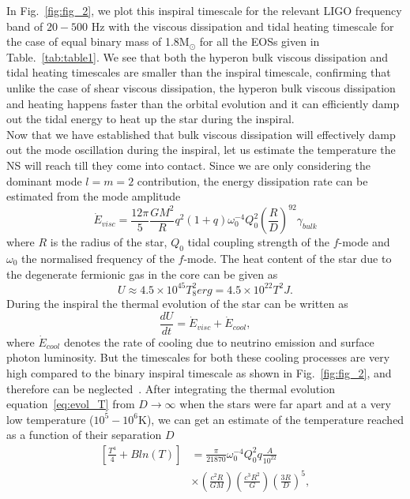 \documentclass[%
 reprint,
 amsmath,amssymb,
 aps,
]{revtex4-2}
\begin{document}
In Fig.~\ref{fig:fig_2}, we plot this inspiral timescale for the relevant LIGO frequency band of $20-500$ Hz with the viscous dissipation and tidal heating timescale for the case of equal binary mass of 1.8M$_{\odot}$ for all the EOSs given in Table.~\ref{tab:table1}. We see that both the hyperon bulk viscous dissipation and tidal heating timescales are smaller than the inspiral timescale, confirming that unlike the case of shear viscous dissipation, the hyperon bulk viscous dissipation and heating happens faster than the orbital evolution and it can efficiently damp out the tidal energy  to heat up the star during the inspiral. \\

Now that we have established that bulk viscous dissipation will effectively damp out the mode oscillation during the inspiral, let us estimate the temperature the NS will reach till they come into contact. Since we are only considering the dominant mode $l = m = 2$ contribution, the energy dissipation rate can be estimated from the mode amplitude~\cite{Lai_1994}
\begin{equation}\label{eq:viscener}
    \Dot{E}_{visc} = \frac{12\pi}{5}\frac{GM^2}{R}q^2(1+q)\omega_0^{-4}Q_0^2\left(\frac{R}{D}\right)^92\gamma_{bulk}
\end{equation}
where $R$ is the radius of the star, $Q_0$  tidal coupling strength of the $f$-mode and $\omega_0$ the normalised frequency of the $f$-mode. The heat content of the star due to the degenerate fermionic gas in the core can be given as~\cite{Lai_1994}
\begin{equation}\label{eq:heat}
    U \approx 4.5\times 10^{45}T_8^2 erg = 4.5\times 10^{22}T^2 J .
\end{equation}
During the inspiral the thermal evolution of the star can be written as
\begin{equation}\label{eq:evol_T}
    \frac{dU}{dt} = \Dot{E}_{visc} + \Dot{E}_{cool},
\end{equation}
where $\Dot{E}_{cool}$ denotes the rate of cooling due to neutrino emission and surface photon luminosity. But the timescales for both these cooling processes are very high compared to the binary inspiral timescale as shown in Fig.~\ref{fig:fig_2}, and therefore can be neglected~\cite{Rees1992}. After integrating the thermal evolution equation~\eqref{eq:evol_T} from $D \to \infty$ when the stars were far apart and at a very low temperature ($10^5 - 10^6$K), we can get an estimate of the temperature reached as a function of their separation $D$
\begin{equation}\label{eq:final_T}
\begin{split}
    \left[\frac{T^4}{4} + Bln(T)\right] &=  \frac{\pi}{21870}\omega_0^{-4}Q_0^2q\frac{A}{10^{22}} \\ & \times \left(\frac{c^2R}{GM}\right)\left(\frac{c^3R^2}{G}\right)\left(\frac{3R}{D}\right)^5,
\end{split}    
\end{equation}
\end{document}
